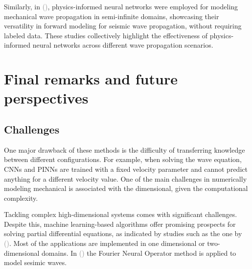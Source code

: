 \documentclass[11pt,twoside]{article}
\renewcommand{\citep}[2][]{\textcolor{gray}{(\citeauthor{#2}, \citeyear[#1]{#2})}}
\renewcommand{\citeauthoryear}[2][]{\textcolor{gray}{\citeauthor{#2} (\textcolor{gray}{\citeyear[#1]{#2}})}}
\begin{document}


Similarly, in \citeauthoryear{ren_seismicnet_2024}, physics-informed neural networks were employed for modeling mechanical wave propagation in semi-infinite domains, showcasing their versatility in forward modeling for seismic wave propagation, without requiring labeled data. These studies collectively highlight the effectiveness of physics-informed neural networks across different wave propagation scenarios.




\section{Final remarks and future perspectives}\label{sec:final_remarks_and_perspectives}

\subsection{Challenges}

One major drawback of these methods is the difficulty of transferring knowledge between different configurations. For example, when solving the wave equation, CNNs and PINNs are trained with a fixed velocity parameter and cannot predict anything for a different velocity value. One of the main challenges in numerically modeling mechanical is associated with the dimensional, given the computational complexity.

Tackling complex high-dimensional systems comes with significant challenges. Despite this, machine learning-based algorithms offer promising prospects for solving partial differential equations, as indicated by studies such as the one by \citeauthoryear{blechschmidt_three_2021}. Most of the applications are implemented in one dimensional or two-dimensional domains. In \citeauthoryear{lehmann_fourier_2023} the Fourier Neural Operator method is applied to model sesimic waves.
\end{document}
